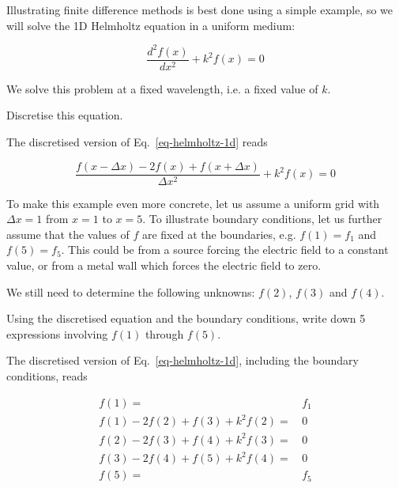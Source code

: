 \pagebreak



Illustrating finite difference methods is best done using a simple example, so we will solve the 1D Helmholtz equation in a uniform medium:

\begin{equation}
\frac{d^2 f(x)}{d x^2} + k^2 f(x) = 0 \label{eq-helmholtz-1d}
\end{equation} 

We solve this problem at a fixed wavelength, i.e. a fixed value of $k$.

\begin{cue}
  Discretise this equation.
\end{cue}

The discretised version of Eq.~\ref{eq-helmholtz-1d} reads

\begin{equation}
\frac{f(x - \Delta x) -2 f(x) + f(x + \Delta x)}{ \Delta x^2} + k^2 f(x) = 0 \label{eq-hh-diff}
\end{equation}  
 
To make this example even more concrete, let us assume a uniform grid with $\Delta x=1$ from $x=1$ to $x=5$. To illustrate boundary conditions, let us further assume that the values of $f$ are fixed at the boundaries, e.g. $f(1)=f_1$ and $f(5)=f_5$. This could be from a source forcing the electric field to a constant value, or from a metal wall which forces the electric field to zero. 

We still need to determine the following unknowns: $f(2)$, $f(3)$ and $f(4)$.


\begin{cue}
Using the discretised equation and the boundary conditions, write down 5 expressions involving $f(1)$ through $f(5)$.
\end{cue}

The discretised version of Eq.~\ref{eq-helmholtz-1d}, including the boundary conditions, reads

\begin{align}
f(1)=& \, f_1 \\
f(1) -2f(2) + f(3) + k^2 f(2) =& \, 0 \\
f(2) -2f(3) + f(4) + k^2 f(3) =& \, 0\\
f(3) -2f(4) + f(5) + k^2 f(4) =& \, 0\\
f(5)=& \, f_5
\end{align} 

